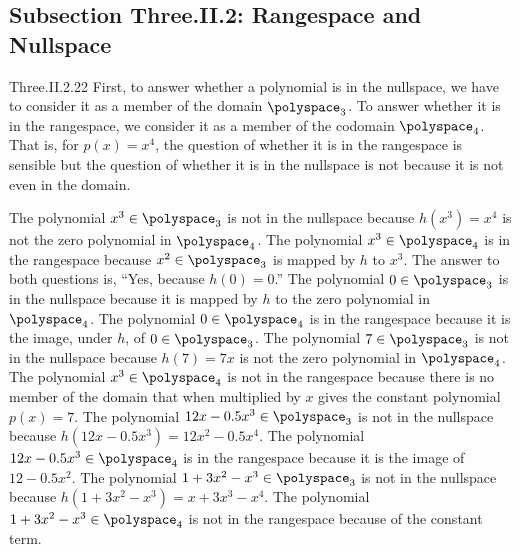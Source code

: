 \subsection{Subsection Three.II.2: Rangespace and Nullspace}
\begin{ans}{Three.II.2.22}
      First, to answer whether a polynomial is in the nullspace,
      we have to consider it as a member of the domain $\polyspace_3$.
      To answer whether it is in the rangespace, we consider it as a member of
      the codomain $\polyspace_4$.
      That is, for $p(x)=x^4$, the question of whether it is in the rangespace
      is sensible but the question of whether it is in the nullspace is not
      because it is not even in the domain.
      \begin{exparts}
        \partsitem The polynomial $x^3\in\polyspace_3$ is not in the nullspace
            because $h(x^3)=x^4$ is not the zero polynomial in $\polyspace_4$.
            The polynomial $x^3\in\polyspace_4$ is in the rangespace because
            $x^2\in\polyspace_3$ is mapped by $h$ to $x^3$.
        \partsitem The answer to both questions is, ``Yes, because
            $h(0)=0$.''
            The polynomial $0\in\polyspace_3$ is in the nullspace
            because it is mapped by $h$ to the zero polynomial in
            $\polyspace_4$.
            The polynomial $0\in\polyspace_4$ is in the rangespace because
            it is the image, under $h$, of $0\in\polyspace_3$.
        \partsitem The polynomial $7\in\polyspace_3$ is not in the nullspace
            because $h(7)=7x$ is not the zero polynomial in $\polyspace_4$.
            The polynomial $x^3\in\polyspace_4$ is not in the rangespace
            because there is no member of the domain that when multiplied
            by $x$ gives the constant polynomial $p(x)=7$.
        \partsitem The polynomial $12x-0.5x^3\in\polyspace_3$ is not in the
            nullspace because $h(12x-0.5x^3)=12x^2-0.5x^4$.
            The polynomial $12x-0.5x^3\in\polyspace_4$ is in the rangespace
            because it is the image of $12-0.5x^2$.
        \partsitem The polynomial $1+3x^2-x^3\in\polyspace_3$ is not in the
            nullspace because $h(1+3x^2-x^3)=x+3x^3-x^4$.
            The polynomial $1+3x^2-x^3\in\polyspace_4$ is not in the
            rangespace because of the constant term.
      \end{exparts}
    
\end{ans}

